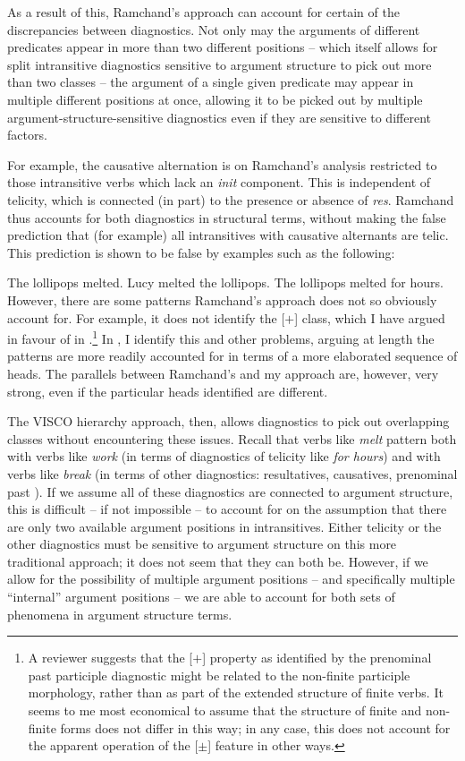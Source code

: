 \documentclass[output=paper]{langsci/langscibook}
\begin{document}
As a result of this, Ramchand’s approach can account for certain of the
discrepancies between  diagnostics. Not only may the
arguments of different predicates appear in more than two different positions –
which itself allows for split intransitive diagnostics sensitive to argument
structure to pick out more than two classes – the argument of a single given
predicate may appear in multiple different positions at once, allowing it to be
picked out by multiple argument-structure-sensitive diagnostics even if they
are sensitive to different factors.

For example, the causative alternation is on Ramchand’s analysis restricted to
those intransitive verbs which lack an \emph{init} component. This is
independent of telicity, which is connected (in part) to the presence or
absence of \emph{res}. Ramchand thus accounts for both diagnostics in
structural terms, without making the false prediction that (for example) all
intransitives with causative alternants are telic. This prediction is shown to
be false by examples such as the following:

\ea
    \ea The lollipops melted.
    \ex Lucy melted the lollipops.
    \z
\ex
    The lollipops melted for hours.
\z
However, there are some patterns Ramchand’s approach does not so obviously
account for. For example, it does not identify the [$+$\Change{}] class, which I
have argued in favour of in .\footnote{A reviewer suggests that the
    [$+$\Change{}] property as identified by the prenominal past participle
    diagnostic might be related to the non-finite participle morphology, rather
    than as part of the extended structure of finite verbs. It seems to me most
    economical to assume that the structure of finite and non-finite forms does
    not differ in this way; in any case, this does not account for the apparent
operation of the [$\pm$\Change{}] feature in other ways.}  In \citet{Baker2018}, I
identify this and other problems, arguing at length the patterns are more
readily accounted for in terms of a more elaborated sequence of heads. The
parallels between Ramchand’s and my approach are, however, very strong, even if
the particular heads identified are different.

The VISCO hierarchy approach, then, allows diagnostics to pick out overlapping
classes without encountering these issues. Recall that verbs like \emph{melt}
pattern both with verbs like \emph{work} (in terms of diagnostics of telicity
like \emph{for hours}) and with verbs like \emph{break} (in terms of other
diagnostics: resultatives, causatives, prenominal past ). If we
assume all of these diagnostics are connected to argument structure, this is
difficult – if not impossible – to account for on the assumption that there are
only two available argument positions in intransitives. Either telicity or the
other diagnostics must be sensitive to argument structure on this more
traditional approach; it does not seem that they can both be. However, if we
allow for the possibility of multiple argument positions – and specifically
multiple \enquote{internal} argument positions – we are able to account for
both sets of phenomena in argument structure terms.
\end{document}
